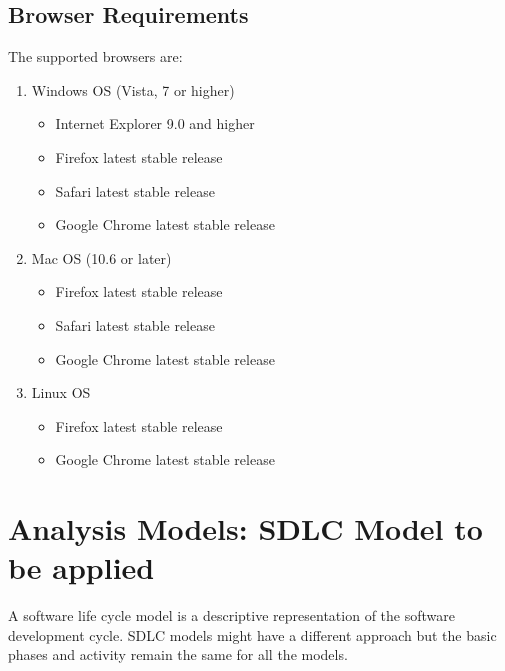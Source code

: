 \documentclass[oneside,a4paper,12pt]{book}
\begin{document}
\subsection{Browser Requirements}
The supported browsers are:
\begin{enumerate}
    \item  Windows OS (Vista, 7 or higher)
    \begin{itemize}
        \item Internet Explorer 9.0 and higher
        \item Firefox latest stable release
        \item Safari latest stable release
        \item Google Chrome latest stable release
    \end{itemize}
    \item Mac OS (10.6 or later)
    \begin{itemize}
        \item Firefox latest stable release
        \item Safari latest stable release
        \item Google Chrome latest stable release
    \end{itemize}
    \item Linux OS
    \begin{itemize}
        \item Firefox latest stable release
        \item Google Chrome latest stable release
    \end{itemize}
\end{enumerate}
\section{Analysis Models: SDLC Model to be applied}

A software life cycle model is a descriptive representation of the software development cycle. SDLC models might have a different approach but the basic phases and activity remain the same for all the models.
\end{document}
